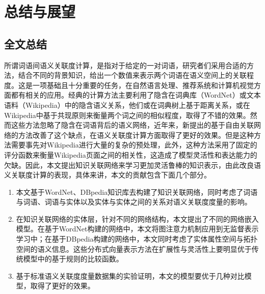 \chapter{总结与展望}
\label{chap:chap07}

\section{全文总结}

所谓词语间语义关联度计算，是指对于给定的一对词语，研究者们采用合适的方法，结合不同的背景知识，给出一个数值来表示两个词语在语义空间上的关联程度。这是一项基础且十分重要的任务，在自然语言处理、推荐系统和计算机视觉方面都有相关的应用。经典的计算方法主要利用了隐含在词典库（WordNet）或文本语料（Wikipedia）中的隐含语义关系，他们或在词典树上基于距离关系，或在Wikipedia中基于共现原则来衡量两个词之间的相似程度，取得了不错的效果。然而这些方法忽略了隐含在词语背后的语义网络，近年来，新提出的基于自由关联网络的方法改善了这个缺点，在语义关联度计算方面取得了更好的效果。但是这种方法需要事先对Wikipedia进行大量的复杂的预处理，此外，这种方法采用了固定的评分函数来衡量Wikipedia页面之间的相关性，这造成了模型灵活性和表达能力的欠缺。因此，本文提出知识关联网络来学习更加灵活鲁棒的知识表示，由此改良语义关联度计算的表现，具体来讲，本文的贡献包含下面几个部分。
\begin{enumerate}[（1）]
    \item 本文基于WordNet、DBpedia知识库去构建了知识关联网络，同时考虑了词语与词语、词语与实体以及实体与实体之间的关系对语义关联度度量的影响。
    \item 在知识关联网络的实体层，针对不同的网络结构，本文提出了不同的网络嵌入模型。在基于WordNet构建的网络中，本文将图注意力机制应用到无监督表示学习中；在基于DBpedia构建的网络中，本文同时考虑了实体属性空间与拓扑空间的语义信息。这些分布式向量表示方法在扩展性与灵活性上要明显优于传统模型中的基于规则的比较函数。
    \item 基于标准语义关联度度量数据集的实验证明，本文的模型要优于几种对比模型，取得了更好的效果。
\end{enumerate}

